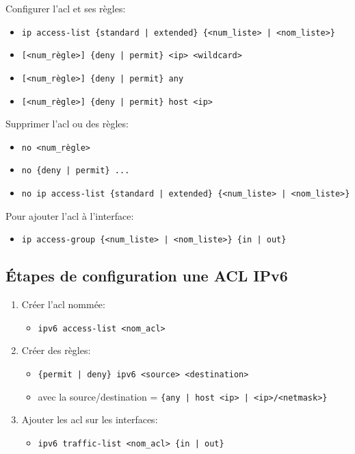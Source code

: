 \documentclass[a4paper]{article}
\begin{document}
Configurer l'acl et ses règles:
\begin{itemize}
    \item \texttt{ip access-list \{standard | extended\} \{<num\_liste> | <nom\_liste>\}}
    \item \texttt{[<num\_règle>] \{deny | permit\} <ip> <wildcard>}
    \item \texttt{[<num\_règle>] \{deny | permit\} any}
    \item \texttt{[<num\_règle>] \{deny | permit\} host <ip>}
\end{itemize}
Supprimer l'acl ou des règles:
\begin{itemize}
    \item \texttt{no <num\_règle>}
    \item \texttt{no \{deny | permit\} ...}
    \item \texttt{no ip access-list \{standard | extended\} \{<num\_liste> | <nom\_liste>\}}
\end{itemize}
Pour ajouter l'acl à l'interface:
\begin{itemize}
    \item \texttt{ip access-group \{<num\_liste> | <nom\_liste>\} \{in | out\}}
\end{itemize}





\subsection{Étapes de configuration une ACL IPv6}



\begin{enumerate}
    \item Créer l'acl nommée:
    \begin{itemize}[label=\textbf{–}]
        \item \texttt{ipv6 access-list <nom\_acl>}
    \end{itemize}
    \item Créer des règles:
    \begin{itemize}[label=\textbf{–}]
        \item \texttt{\{permit | deny\} ipv6 <source> <destination>}
        \item avec la source/destination = \texttt{\{any | host <ip> | <ip>/<netmask>\}}
    \end{itemize}
    \item Ajouter les acl sur les interfaces:
    \begin{itemize}[label=\textbf{–}]
        \item \texttt{ipv6 traffic-list <nom\_acl> \{in | out\}}
    \end{itemize}
\end{enumerate}
\end{document}
